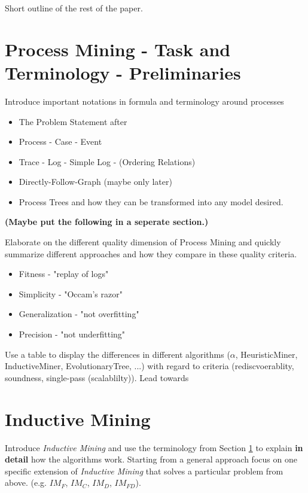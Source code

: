 \documentclass[a4paper]{IEEEtran}
\begin{document}
Short outline of the rest of the paper.

\section{Process Mining - Task and Terminology - Preliminaries}
\label{sec:terminology}
Introduce important notations in formula and terminology around processes
\begin{itemize}
    \item The Problem Statement after \cite{process_mining}
    \item Process - Case - Event 
    \item Trace - Log - Simple Log - (Ordering Relations) 
    \item Directly-Follow-Graph (maybe only later)
    \item Process Trees and how they can be transformed into any model desired. 
\end{itemize}
\textbf{(Maybe put the following in a seperate section.)}


Elaborate on the different quality dimension of Process Mining and quickly summarize different approaches and how they compare in these quality criteria.
\begin{itemize}
    \item Fitness - "replay of logs"
    \item Simplicity - "Occam's razor" 
    \item Generalization - "not overfitting" 
    \item Precision - "not underfitting" 
\end{itemize}
Use a table to display the differences in different algorithms ($\alpha$, HeuristicMiner, InductiveMiner, EvolutionaryTree, ...) with regard to criteria (rediscvoerablity, soundness, single-pass (scalablilty)).
Lead towards 

\section{Inductive Mining}
\label{sec:inductivemining}
Introduce \textit{Inductive Mining} and use the terminology from Section \ref{sec:terminology} to explain \textbf{in detail} how the algorithms work. Starting from a general approach focus on one specific extension of \textit{Inductive Mining} that solves a particular problem from above. (e.g. $IM_F$, $IM_C$, $IM_D$, $IM_{FD}$).
\end{document}

